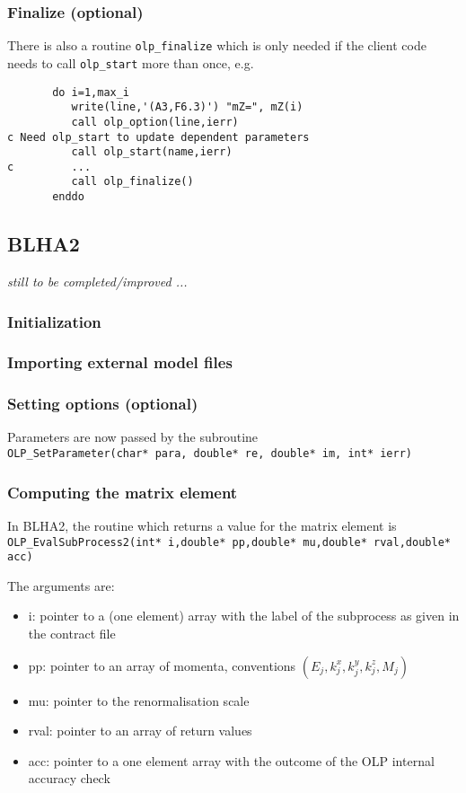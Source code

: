 \subsubsection{Finalize (optional)}
There is also a routine \texttt{olp\_finalize} which is only needed
if the client code needs to call \texttt{olp\_start} more than once, e.g.
\begin{lstlisting}
       do i=1,max_i
          write(line,'(A3,F6.3)') "mZ=", mZ(i)
          call olp_option(line,ierr)
c Need olp_start to update dependent parameters
          call olp_start(name,ierr)
c         ...
          call olp_finalize()
       enddo
\end{lstlisting}

\subsection{BLHA2}

{\it still to be completed/improved ...}
%
\subsubsection{Initialization}

\subsubsection{Importing external model files}

\subsubsection{Setting options (optional)}
Parameters are now passed by the subroutine \\
{\tt OLP\_SetParameter(char* para, double* re, double* im, int* ierr)}


\subsubsection{Computing the matrix element}

In BLHA2, the routine which returns a value for the matrix element is\\
{\small {\tt OLP\_EvalSubProcess2(int* i,double* pp,double* mu,double* rval,double* acc)}}


The arguments are:
\begin{itemize}
\item i: pointer to a (one element) array with the label of the subprocess as given in the contract file
\item pp: pointer to an array of momenta, conventions $(E_j,k_j^x,k_j^y,k_j^z,M_j)$
\item mu: pointer to the renormalisation scale 
\item rval: pointer to an array of return values
\item acc: pointer to a one element array with the outcome of the 
OLP internal accuracy check 
\end{itemize}


